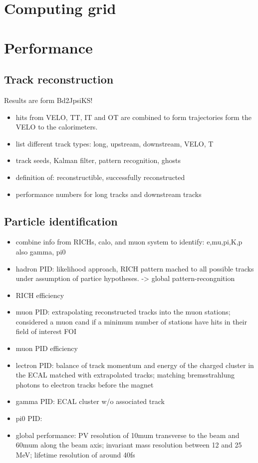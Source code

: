 \section{Computing grid}
\section{Performance}
\subsection{Track reconstruction}
Results are form Bd2JpsiKS!
\begin{itemize}
  \item hits from VELO, TT, IT and OT are combined to form trajectories form the VELO to the calorimeters. 
  \item list different track types: long, upstream, downstream, VELO, T
  \item track seeds, Kalman filter, pattern recognition, ghosts
  \item definition of: reconstructible, successfully reconstructed
  \item performance numbers for long tracks and downstream tracks
\end{itemize}
\subsection{Particle identification}
\begin{itemize}
  \item combine info from RICHs, calo, and muon system to identify: e,mu,pi,K,p also gamma, pi0
  \item hadron PID: likelihood approach, RICH pattern mached to all possible tracks under assumption of partice hypotheses. -> global pattern-recongnition
  \item RICH efficiency
  \item muon PID: extrapolating reconstructed tracks into the muon stations; considered a muon cand if a minimum number of stations have hits in their field of interest FOI
  \item muon PID efficiency
  \item lectron PID: balance of track momentum and energy of the charged cluster in the ECAL matched with extrapolated tracks; matching bremsstrahlung photons to electron tracks before the magnet
  \item gamma PID: ECAL cluster w/o associated track
  \item pi0 PID: 
  \item global performance: PV resolution of 10mum transverse to the beam and 60mum along the beam axis; invariant mass resolution between 12 and 25 MeV; lifetime resolution of around 40fs
\end{itemize}
